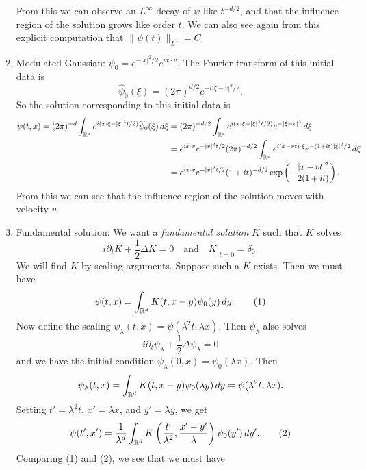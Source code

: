 \begin{example}
\begin{enumerate}
\[      \]
      From this we can observe an $L^\infty$ decay
      of $\psi$ like $t^{-d / 2}$, and that the influence
      region of the solution grows like order $t$.
      We can also see again from this explicit
      computation that $\|\psi(t)\|_{L^2} = C$.
    \item Modulated Gaussian: $\psi_0 = e^{-|x|^2 / 2} e^{ix \cdot v}$.
      The Fourier transform of this initial data is
      \[
        \widehat{\psi}_0(\xi)
        = (2\pi)^{d / 2} e^{-i|\xi - v|^2 / 2}.
      \]
      So the solution corresponding to this initial
      data is
      \begin{align*}
        \psi(t, x)
        = (2\pi)^{-d} \int_{\mathbb{R}^d} e^{i(x \cdot \xi - |\xi|^2 t / 2)} \widehat{\psi}_0(\xi) \, d\xi
        &= (2\pi)^{-d / 2} \int_{\mathbb{R}^d} e^{i(x \cdot \xi - |\xi|^2 t / 2)} e^{-|\xi - v|^2} \, d\xi \\
        &= e^{ix \cdot v} e^{-|v|^2 t / 2} (2\pi)^{-d / 2}
        \int_{\mathbb{R}^d} e^{i(x - vt) \cdot \xi} e^{-(1 + it) |\xi|^2 / 2}\, d\xi \\
        &= e^{ix \cdot v} e^{-|v|^2 t / 2}
        (1 + it)^{-d / 2}
        \exp\left(-\frac{|x - vt|^2}{2(1 + it)}\right).
      \end{align*}
      From this we can see that the influence region
      of the solution moves with velocity $v$.
    \item Fundamental solution: We want a
      \emph{fundamental solution} $K$ such that
      $K$ solves
      \[
        i \partial_t K + \frac{1}{2} \Delta K = 0
        \quad \text{and} \quad K|_{t = 0} = \delta_0.
      \]
      We will find $K$ by scaling arguments. Suppose
      such a $K$ exists. Then we must have
      \[
        \psi(t, x) = \int_{\mathbb{R}^d} K(t, x - y) \psi_0(y)\, dy. \tag{1}
      \]
      Now define the scaling
      $\psi_\lambda(t, x) = \psi(\lambda^2 t, \lambda x)$.
      Then $\psi_\lambda$ also solves
      \[
        i \partial_t \psi_\lambda + \frac{1}{2} \Delta \psi_\lambda = 0
      \]
      and we have the initial condition
      $\psi_\lambda(0, x) = \psi_0(\lambda x)$. Then
      \[
        \psi_\lambda(t, x)
        = \int_{\mathbb{R}^d} K(t, x - y)\psi_0(\lambda y)\, dy
        = \psi(\lambda^2 t, \lambda x).
      \]
      Setting $t' = \lambda^2 t$, $x' = \lambda x$, and
      $y' = \lambda y$, we get
      \[
        \psi(t', x')
        = \frac{1}{\lambda^d} \int_{\mathbb{R}^d} K\left(\frac{t'}{\lambda^2}, \frac{x' - y'}{\lambda}\right)
        \psi_0(y')\, dy'.
        \tag{2}
      \]
      Comparing (1) and (2), we see that we must have

\end{enumerate}
\end{example}
